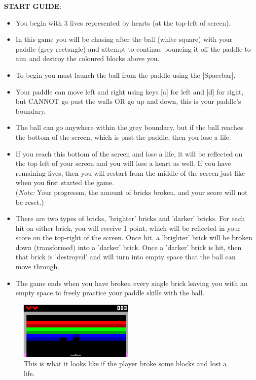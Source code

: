 \documentclass{article}
\begin{document}
\begin{enumerate}
\textbf{START GUIDE}:
\begin{itemize}
    \item You begin with 3 lives represented by hearts (at the top-left of screen). 
    \item In this game you will be chasing after the ball (white square) with your paddle (grey rectangle) and attempt to continue bouncing it off the paddle to aim and destroy the coloured blocks above you.
    \item To begin you must launch the ball from the paddle using the [Spacebar].
    \item Your paddle can move left and right using keys [a] for left and [d] for right, but CANNOT go past the walls OR go up and down, this is your paddle's boundary.
    \item The ball can go anywhere within the grey boundary, but if the ball reaches the bottom of the screen, which is past the paddle, then you lose a life.
    \item If you reach this bottom of the screen and lose a life, it will be reflected on the top left of your screen and you will lose a heart as well. 
    If you have remaining lives, then you will restart from the middle of the screen just like when you first started the game. \\ 
    (\emph{Note:} Your progressm, the amount of bricks broken, and your score will not be reset.)
    \item There are two types of bricks, 'brighter' bricks and 'darker' bricks. For each hit on either brick, you will receive 1 point, which will be reflected in your score on the top-right of the screen. Once hit, a 'brighter' brick will be broken down (transformed) into a 'darker' brick. Once a 'darker' brick is hit, then that brick is 'destroyed' and will turn into empty space that the ball can move through. 
    \item The game ends when you have broken every single brick leaving you with an empty space to freely practice your paddle skills with the ball.
\end{itemize}

\begin{figure}[ht!]
    \centering
    \includegraphics[width=0.5\textwidth]{gameplay1.png}
    \caption{This is what it looks like if the player broke some blocks and lost a life.}
    \label{f: Gameplay 1}
\end{figure}


\end{enumerate}
\end{document}
